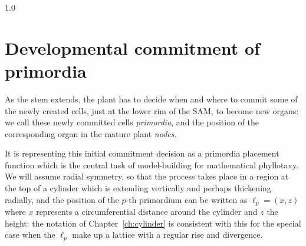 %
{1.0}





\section{Developmental commitment of primordia}


As the stem extends, the plant has to decide when and where to commit some of the newly created cells, just at the lower rim of the SAM, to become new organs: we call these newly committed cells \textit{primordia}, and the position of the corresponding organ in the mature plant \textit{nodes}. 

It is representing this initial commitment decision as a primordia placement function which is the central task of model-building for mathematical phyllotaxy. We will assume radial symmetry, so that the process takes place in a region at the top of a cylinder which is extending vertically and perhaps thickening radially, and the position of the $p$-th primordium can be written as $\ell_p=(x,z)$ where $x$ represents a circumferential distance around the cylinder and $z$ the height: the notation of Chapter~\ref{ch:cylinder} is consistent with this for the special case when the $\ell_p$ make up a lattice with a regular rise and divergence. 

